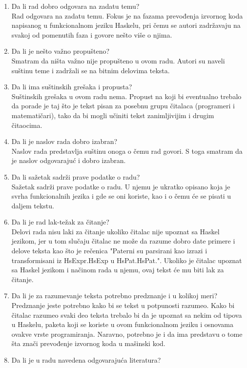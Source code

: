 \documentclass[a4paper]{report}
\begin{document}
\begin{enumerate}
\item Da li rad dobro odgovara na zadatu temu?\\
Rad odgovara na zadatu temu. Fokus je na fazama prevođenja izvornog koda napisanog u funkcionalnom jeziku Haskelu, pri čemu se autori zadržavaju na svakoj od pomenutih faza i govore nešto više o njima.
\item Da li je nešto važno propušteno?\\
Smatram da ništa važno nije propušteno u ovom radu. Autori su naveli suštinu teme i zadržali se na bitnim delovima teksta.
\item Da li ima suštinskih grešaka i propusta?\\
Suštinskih grešaka u ovom radu nema. Propust na koji bi eventualno trebalo da porade je taj što je tekst pisan za posebnu grupu čitalaca (programeri i matematičari), tako da bi mogli učiniti tekst zanimljivijim i drugim čitaocima.
\item Da li je naslov rada dobro izabran?\\
Naslov rada predstavlja suštinu onoga o čemu rad govori. S toga smatram da je naslov odgovarajuć i dobro izabran.
\item Da li sažetak sadrži prave podatke o radu?\\
Sažetak sadrži prave podatke o radu. U njemu je ukratko opisano koja je svrha funkcionalnih jezika i gde se oni koriste, kao i o čemu će se pisati u daljem tekstu.
\item Da li je rad lak-težak za čitanje?\\
Delovi rada nisu laki za čitanje ukoliko čitalac nije upoznat sa Haskel jezikom, jer u tom slučaju čitalac ne može da razume dobro date primere i delove teksta kao što je rečenica "Paterni su parsirani kao izrazi i transformisani iz HsExpr.HsExp u
HsPat.HsPat.". Ukoliko je čitalac upoznat sa Haskel jezikom i načinom rada u njemu, ovaj tekst će mu biti lak za čitanje.
\item Da li je za razumevanje teksta potrebno predznanje i u kolikoj meri?\\
Predznanje jeste potrebno kako bi se tekst u potpunosti razumeo. Kako bi čitalac razumeo svaki deo teksta trebalo bi da je upoznat sa nekim od tipova u Haskelu, paketa koji se koriste u ovom funkcionalnom jeziku i osnovama ovakve vrste programiranja. Naravno, potrebno je i da ima predstavu o tome šta znači prevođenje izvornog koda u mašinski kod.
\item Da li je u radu navedena odgovarajuća literatura?\\

\end{enumerate}
\end{document}
